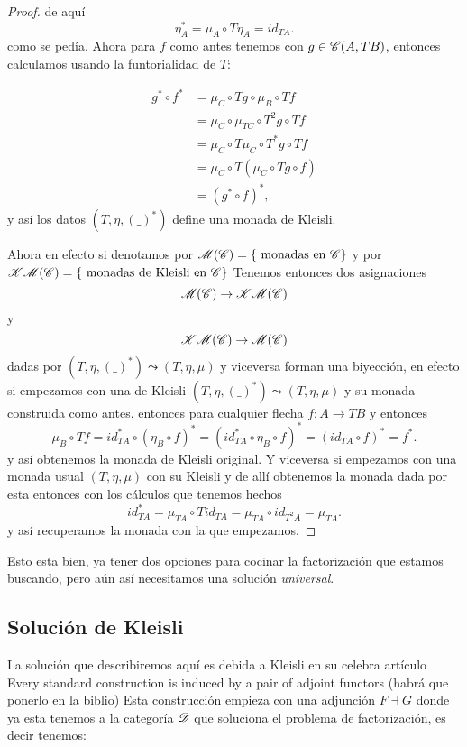 \documentclass{comunicaciones}
\begin{document}
\begin{proof}
 de aquí \[\eta_{A}^{*}=\mu_{A}\circ T\eta_{A}=id_{TA}.\]
como se pedía.
Ahora para $f$ como antes tenemos con $g\in\EuScript{C}(A,TB)$, entonces calculamos usando la funtorialidad de $T$: 


\[
    \begin{aligned}
        g^{*}\circ f^{*}
        &= \mu_{C}\circ Tg\circ\mu_{B}\circ Tf \\
        &= \mu_{C}\circ\mu_{TC}\circ T^{2}g\circ Tf\\
        &= \mu_{C}\circ T\mu_{C}\circ T^{*}g\circ Tf \\
        &=\mu_{C}\circ T(\mu_{C}\circ Tg\circ f)\\
        &=(g^{*}\circ f)^{*},
        \end{aligned}\]
y así los datos $(T,\eta,(\_)^{*})$ define una monada de Kleisli.

Ahora en efecto si denotamos por $\mathcal{M}(\EuScript{C})=\{\text{ monadas en }\EuScript{C}\}$ y por $\mathcal{K}\mathcal{M}(\EuScript{C})=\{\text{ monadas de Kleisli en }\EuScript{C}\}$
Tenemos entonces dos asignaciones \[\mathcal{M}(\EuScript{C})\rightarrow \mathcal{K}\mathcal{M}(\EuScript{C})\] y \[\mathcal{K}\mathcal{M}(\EuScript{C})\rightarrow \mathcal{M}(\EuScript{C})\] dadas por 
$(T,\eta,(\_)^{*})\leadsto (T,\eta,\mu)$ y viceversa forman una biyección, en efecto si empezamos con una de Kleisli $(T,\eta,(\_)^{*})\leadsto (T,\eta,\mu)$ y su monada construida como antes,  entonces para cualquier flecha $f\colon A\rightarrow TB$ y entonces \[\mu_{B}\circ Tf=id^{*}_{TA}\circ(\eta_{B}\circ f)^{*}=(id^{*}_{TA}\circ\eta_{B}\circ f)^{*}=(id_{TA}\circ f)^{*}=f^{*}.\]
y así obtenemos la monada de Kleisli original. 
Y viceversa si empezamos con una monada usual $(T,\eta,\mu)$ con su Kleisli y de allí obtenemos la monada dada por esta entonces con los cálculos que tenemos hechos \[id^{*}_{TA}=\mu_{TA}\circ Tid_{TA}=\mu_{TA}\circ id_{T^{2}A}=\mu_{TA}.\]
y así recuperamos la monada con la que empezamos.

\end{proof}   

Esto esta bien, ya tener dos opciones para cocinar la factorización que estamos buscando, pero aún así necesitamos una solución \emph{universal}.

\subsection{Solución de Kleisli}\label{SOLKLEI}

La solución que describiremos aquí es debida a Kleisli en su celebra artículo Every standard construction is induced by a pair of adjoint functors (habrá que ponerlo en la biblio)
Esta construcción empieza con una adjunción $F\dashv G$ donde ya esta tenemos a la categoría $\EuScript{D}$ que soluciona el problema de factorización, es decir tenemos:
\end{document}
